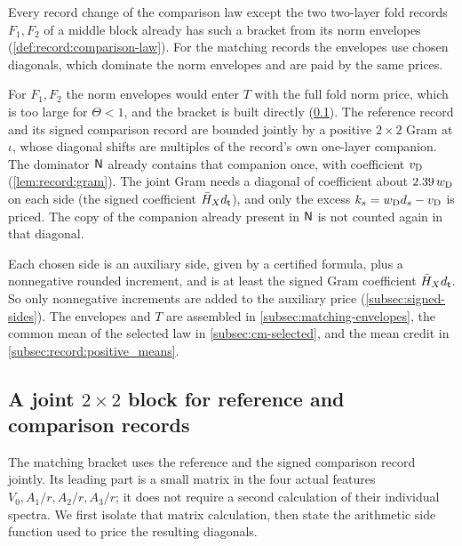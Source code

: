 Every record change of the comparison law except the two two-layer fold
records $F_1,F_2$ of a middle block already has such a bracket from its norm
envelopes (\cref{def:record:comparison-law}). For the matching records the
envelopes use chosen diagonals, which dominate the norm envelopes and are paid
by the same prices.

For $F_1,F_2$ the norm envelopes would enter $T$ with the full
fold norm price, which is too large for $\Theta<1$, and the
bracket is built
directly (\cref{subsec:record:direct_gram}). The reference record and its
signed comparison record are bounded jointly by a positive $2\times2$ Gram at
$\iota$, whose diagonal shifts are multiples of the record's own one-layer
companion. The dominator $\mathsf N$ already contains that companion
once, with coefficient $v_{\rm D}$ (\cref{lem:record:gram}). The joint Gram
needs a diagonal of coefficient about $2.39\,w_{\rm D}$ on each side (the signed
coefficient $\bar H_Xd_\mathsf t$), and only the excess
$k_s=w_{\rm D}d_s-v_{\rm D}$ is priced. The copy of the companion already present in $\mathsf N$ is not counted again in that diagonal.

Each chosen side is an auxiliary side, given by a certified formula, plus a nonnegative rounded increment, and is at least the signed Gram coefficient $\bar H_Xd_\mathsf t$. So only nonnegative increments are added to the
auxiliary price (\cref{subsec:signed-sides}). The envelopes and $T$ are
assembled in \cref{subsec:matching-envelopes}, the common mean of the
selected law in \cref{subsec:cm-selected}, and the mean credit in
\cref{subsec:record:positive_means}.

\subsection{A joint \texorpdfstring{$2\times2$}{2 x 2} block for reference and comparison records}\label{subsec:record:direct_gram}

The matching bracket uses the reference and the signed comparison record
jointly. Its leading part is a small matrix in the four actual features
$V_0,A_1/r,A_2/r,A_3/r$; it does not require a second calculation of their
individual spectra. We first isolate that matrix calculation, then state the
arithmetic side function used to price the resulting diagonals.

